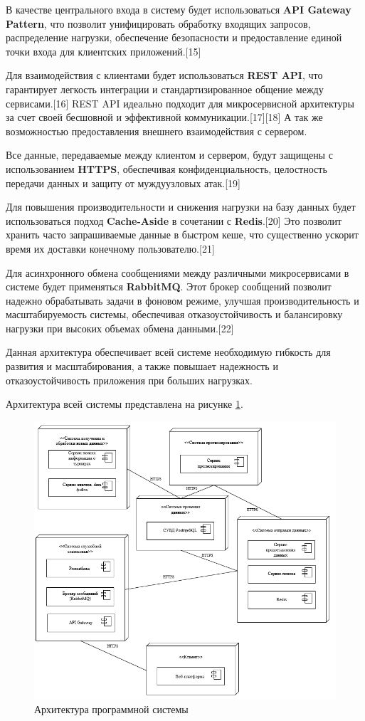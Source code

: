 В качестве центрального входа в систему будет использоваться \textbf{API Gateway Pattern}, что позволит унифицировать обработку входящих запросов, распределение нагрузки, обеспечение безопасности и предоставление единой точки входа для клиентских приложений.[15]

Для взаимодействия с клиентами будет использоваться \textbf{REST API}, что гарантирует легкость интеграции и стандартизированное общение между сервисами.[16] REST API идеально подходит для микросервисной архитектуры за счет своей бесшовной и эффективной коммуникации.[17][18] А так же возможностью предоставления внешнего взаимодействия с сервером.

Все данные, передаваемые между клиентом и сервером, будут защищены с использованием \textbf{HTTPS}, обеспечивая конфиденциальность, целостность передачи данных и защиту от муждуузловых атак.[19]

Для повышения производительности и снижения нагрузки на базу данных будет использоваться подход \textbf{Cache-Aside} в сочетании с \textbf{Redis}.[20] Это позволит хранить часто запрашиваемые данные в быстром кеше, что существенно ускорит время их доставки конечному пользователю.[21]

Для асинхронного обмена сообщениями между различными микросервисами в системе будет применяться \textbf{RabbitMQ}. Этот брокер сообщений позволит надежно обрабатывать задачи в фоновом режиме, улучшая производительность и масштабируемость системы, обеспечивая отказоустойчивость и балансировку нагрузки при высоких объемах обмена данными.[22]

Данная архитектура обеспечивает всей системе необходимую гибкость для развития и масштабирования, а также повышает надежность и отказоустойчивость приложения при больших нагрузках.

Архитектура всей системы представлена на рисунке \ref{fig:-architecture}.
\begin{figure}
	\centering
	\includegraphics[width=0.9\linewidth]{"images/Архитектура"}
	\caption{Архитектура программной системы}
	\label{fig:-architecture}
\end{figure}

